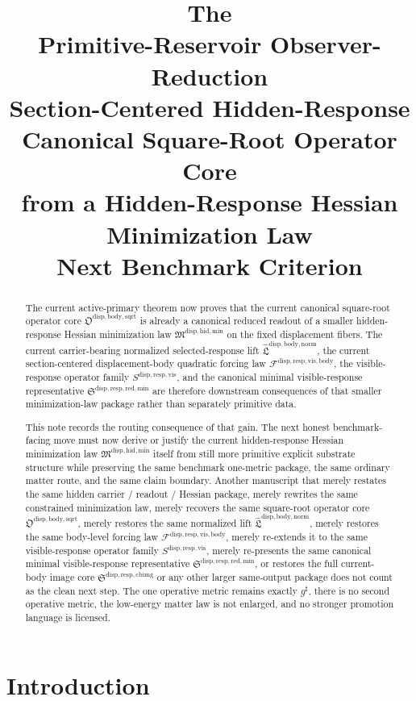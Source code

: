 \documentclass[11pt]{article}
\title{\textbf{The \TheoryName{}}\\[0.4em]
\large Primitive-Reservoir Observer-Reduction\\
\large Section-Centered Hidden-Response\\
\large Canonical Square-Root Operator Core\\
\large from a Hidden-Response Hessian\\
\large Minimization Law\\
\large Next Benchmark Criterion}
\author{}
\date{}
\newcommand{\CompletedMetric}{g^{\sharp}}
\newcommand{\HiddenMinimizationPackage}{\mathfrak M^{\mathrm{disp,hid,min}}}
\newcommand{\SquareRootOperatorCore}{\mathfrak O^{\mathrm{disp,body,sqrt}}}
\newcommand{\NormalizedLiftPackage}{\widehat{\mathfrak L}^{\mathrm{disp,body,norm}}}
\newcommand{\VisibleBodyForcingLaw}{\mathscr F^{\mathrm{disp,resp,vis,body}}}
\newcommand{\VisibleResponseOperator}{S^{\mathrm{disp,resp,vis}}}
\newcommand{\MinimalReducedStructure}{\mathfrak S^{\mathrm{disp,resp,red,min}}}
\newcommand{\CurrentBodyImageCore}{\mathfrak S^{\mathrm{disp,resp,cbimg}}}
\begin{document}
\maketitle

\begin{abstract}
The current active-primary theorem now proves that the current canonical square-root operator core \(\SquareRootOperatorCore\) is already a canonical reduced readout of a smaller hidden-response Hessian minimization law \(\HiddenMinimizationPackage\) on the fixed displacement fibers. The current carrier-bearing normalized selected-response lift \(\NormalizedLiftPackage\), the current section-centered displacement-body quadratic forcing law \(\VisibleBodyForcingLaw\), the visible-response operator family \(\VisibleResponseOperator\), and the canonical minimal visible-response representative \(\MinimalReducedStructure\) are therefore downstream consequences of that smaller minimization-law package rather than separately primitive data.

This note records the routing consequence of that gain. The next honest benchmark-facing move must now derive or justify the current hidden-response Hessian minimization law \(\HiddenMinimizationPackage\) itself from still more primitive explicit substrate structure while preserving the same benchmark one-metric package, the same ordinary matter route, and the same claim boundary. Another manuscript that merely restates the same hidden carrier / readout / Hessian package, merely rewrites the same constrained minimization law, merely recovers the same square-root operator core \(\SquareRootOperatorCore\), merely restores the same normalized lift \(\NormalizedLiftPackage\), merely restores the same body-level forcing law \(\VisibleBodyForcingLaw\), merely re-extends it to the same visible-response operator family \(\VisibleResponseOperator\), merely re-presents the same canonical minimal visible-response representative \(\MinimalReducedStructure\), or restores the full current-body image core \(\CurrentBodyImageCore\) or any other larger same-output package does not count as the clean next step. The one operative metric remains exactly \(\CompletedMetric\), there is no second operative metric, the low-energy matter law is not enlarged, and no stronger promotion language is licensed.
\end{abstract}

\section{Introduction}
\end{document}
